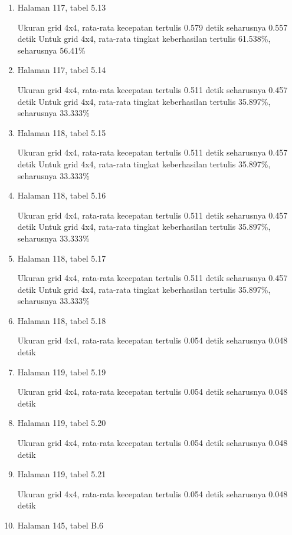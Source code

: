 \documentclass[11pt,a4paper,twoside,openright]{article}
\begin{document}
\begin{enumerate}
\item Halaman 117, tabel 5.13

Ukuran grid 4x4, rata-rata kecepatan tertulis 0.579 detik seharusnya 0.557 detik
Untuk grid 4x4, rata-rata tingkat keberhasilan tertulis 61.538\%, seharusnya 56.41\%

\item Halaman 117, tabel 5.14

Ukuran grid 4x4, rata-rata kecepatan tertulis 0.511 detik seharusnya 0.457 detik
Untuk grid 4x4, rata-rata tingkat keberhasilan tertulis 35.897\%, seharusnya 33.333\%

\item Halaman 118, tabel 5.15

Ukuran grid 4x4, rata-rata kecepatan tertulis 0.511 detik seharusnya 0.457 detik
Untuk grid 4x4, rata-rata tingkat keberhasilan tertulis 35.897\%, seharusnya 33.333\%

\item Halaman 118, tabel 5.16

Ukuran grid 4x4, rata-rata kecepatan tertulis 0.511 detik seharusnya 0.457 detik
Untuk grid 4x4, rata-rata tingkat keberhasilan tertulis 35.897\%, seharusnya 33.333\%

\item Halaman 118, tabel 5.17

Ukuran grid 4x4, rata-rata kecepatan tertulis 0.511 detik seharusnya 0.457 detik
Untuk grid 4x4, rata-rata tingkat keberhasilan tertulis 35.897\%, seharusnya 33.333\%

\item Halaman 118, tabel 5.18

Ukuran grid 4x4, rata-rata kecepatan tertulis 0.054 detik seharusnya 0.048 detik

\item Halaman 119, tabel 5.19

Ukuran grid 4x4, rata-rata kecepatan tertulis 0.054 detik seharusnya 0.048 detik

\item Halaman 119, tabel 5.20

Ukuran grid 4x4, rata-rata kecepatan tertulis 0.054 detik seharusnya 0.048 detik

\item Halaman 119, tabel 5.21

Ukuran grid 4x4, rata-rata kecepatan tertulis 0.054 detik seharusnya 0.048 detik

\item Halaman 145, tabel B.6


\end{enumerate}
\end{document}
